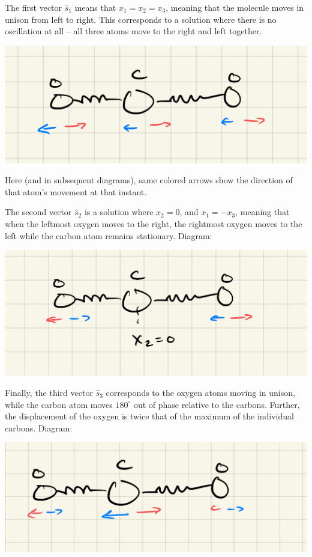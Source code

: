 \documentclass{article}
\begin{document}
\begin{solution}
	The first vector $\hat{s}_1$ means that $x_1 = x_2 = x_3$, meaning that the molecule moves in unison from 
	left to right. This corresponds to a solution where there is no oscillation at all -- all three
	atoms move to the right and left together.

	\begin{center}
		\includegraphics[scale=0.1]{CO2-1.jpeg}
	\end{center}
	Here (and in subsequent diagrams), same colored arrows show the direction of that atom's movement at that
	instant. 

	The second vector $\hat{s}_2$ is a solution where $x_2 = 0$, and $x_1 = -x_3$, meaning that when the leftmost
	oxygen moves to the right, the rightmost oxygen moves to the left while the carbon atom remains 
	stationary. Diagram:

	\begin{center}
		\includegraphics[scale=0.1]{CO2-2.jpeg}
	\end{center}

	Finally, the third vector $\hat{s}_3$ corresponds to the oxygen atoms moving in unison, while the carbon
	atom moves $180^\circ$ out of phase relative to the carbons. Further, the displacement of the oxygen 
	is twice that of the maximum of the individual carbons. Diagram:
	\begin{center}
		\includegraphics[scale=0.1]{CO2-3.jpeg}
	\end{center}
\end{solution}
\end{document}
